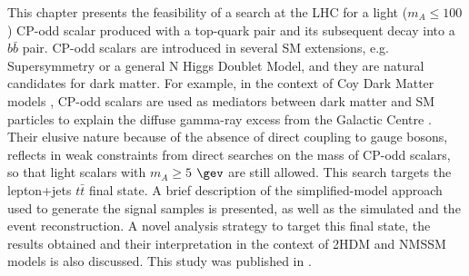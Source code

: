 
This chapter presents the feasibility of a search at the LHC for a light ($m_{A}\le100$ \gev) CP-odd scalar produced with a top-quark pair and its subsequent decay into a $b\bar{b}$ pair.
CP-odd scalars are introduced in several SM extensions, e.g. Supersymmetry or a general N  Higgs Doublet Model, and they are natural candidates for dark matter. For example, in the context of Coy Dark Matter models \cite{Arina:2014yna,Hektor:2014kga,Boehm:2014hva}, CP-odd scalars are used as mediators between dark matter and SM particles to explain the diffuse gamma-ray excess from the Galactic Centre \cite{Goodenough:2009gk,Hooper:2010mq,Abazajian:2012pn,Daylan:2014rsa}. Their elusive nature because of the absence of direct coupling to gauge bosons,  reflects in weak constraints from direct searches \cite{Craig:2015jba,Hajer:2015gka,Dolan:2014ska} on the mass of CP-odd scalars, so that light scalars with $m_{A}\ge5$ $\gev$ are still allowed. This search targets the lepton+jets $t\bar{t}$ final state. A brief description of the simplified-model approach used to generate the signal samples is presented, as well as the simulated and the event reconstruction. A novel analysis strategy to target this final state, the results obtained and their interpretation in the context of 2HDM and NMSSM models is also discussed. This study was published in \cite{Casolino:2015cza}.          
